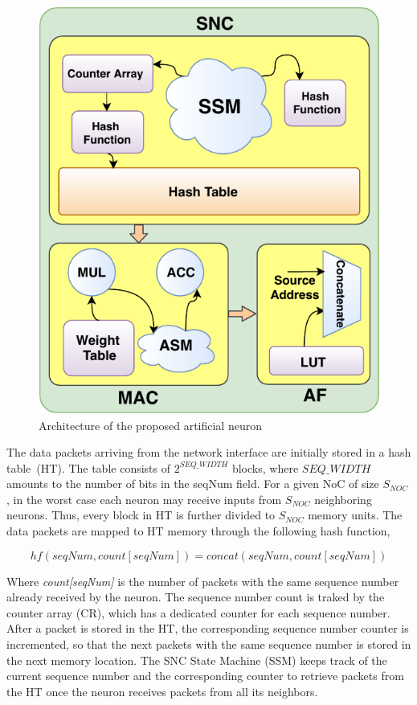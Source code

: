 \begin{figure}
    \centering
    \includegraphics[width =0.8\columnwidth]{Figures/overall2.pdf}
    \caption{Architecture of the proposed artificial neuron}
    \label{fig:neuron}
\end{figure}

The data packets arriving from the network interface are initially stored in a hash table~(HT). 
The table consists of $2^{SEQ\_WIDTH}$ blocks, where $SEQ\_WIDTH$ amounts to the number of bits in the seqNum field. 
For a given NoC of size $S_{NOC}$, in the worst case each neuron may receive inputs from $S_{NOC}$ neighboring neurons. 
Thus, every block in HT is further divided to $S_{NOC}$ memory units. 
The data packets are mapped to HT memory through the following hash function,

\begin{equation}
hf(seqNum,count[seqNum]) = concat(seqNum,count[seqNum])
\label{equation:hf}
\end{equation}

Where \emph{count[seqNum]} is the number of packets with the same sequence number already received by the neuron.
The sequence number count is traked by the counter array (CR), which has a dedicated counter for each sequence number. 
After a packet is stored in the HT, the corresponding sequence number counter is incremented, so that the next packets with the same sequence number is stored in the next memory location. 
The SNC State Machine (SSM) keeps track of the current sequence number and the corresponding counter to retrieve packets from the HT once the neuron receives packets from all its neighbors. 

